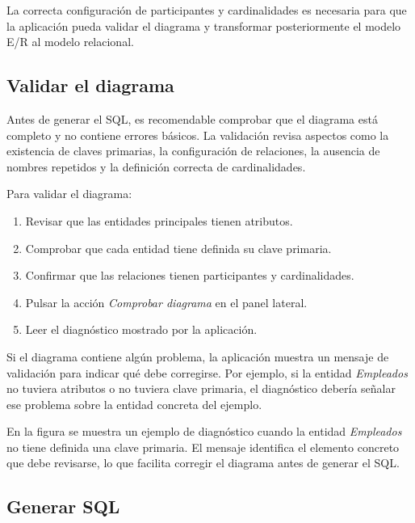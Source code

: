 
La correcta configuración de participantes y cardinalidades es necesaria para que la aplicación pueda validar el diagrama y transformar posteriormente el modelo E/R al modelo relacional.

\subsection{Validar el diagrama}

Antes de generar el SQL, es recomendable comprobar que el diagrama está completo y no contiene errores básicos. La validación revisa aspectos como la existencia de claves primarias, la configuración de relaciones, la ausencia de nombres repetidos y la definición correcta de cardinalidades.

Para validar el diagrama:

\begin{enumerate}
    \item Revisar que las entidades principales tienen atributos.
    \item Comprobar que cada entidad tiene definida su clave primaria.
    \item Confirmar que las relaciones tienen participantes y cardinalidades.
    \item Pulsar la acción \textit{Comprobar diagrama} en el panel lateral.
    \item Leer el diagnóstico mostrado por la aplicación.
\end{enumerate}

Si el diagrama contiene algún problema, la aplicación muestra un mensaje de validación para indicar qué debe corregirse. Por ejemplo, si la entidad \textit{Empleados} no tuviera atributos o no tuviera clave primaria, el diagnóstico debería señalar ese problema sobre la entidad concreta del ejemplo.


En la figura se muestra un ejemplo de diagnóstico cuando la entidad \textit{Empleados} no tiene definida una clave primaria. El mensaje identifica el elemento concreto que debe revisarse, lo que facilita corregir el diagrama antes de generar el SQL.

\subsection{Generar SQL}


